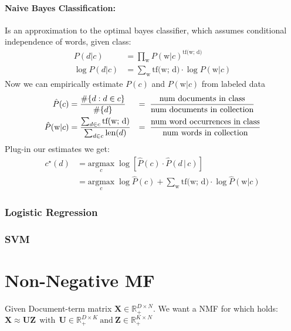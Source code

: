 \documentclass[a4paper,11pt]{article}
\newcommand{\R}{\mathbb{R}}
\newcommand{\msection}[1]{\section{#1}\vspace{-0.5mm}}
\newcommand{\tf}{\text{tf(w; d)}} %
\newcommand{\w}{\text{w}}
\begin{document}
\begin{multicols}{2}
\paragraph{Naive Bayes Classification:}
Is an approximation to the optimal bayes classifier, which assumes conditional independence of words, given class:
\begin{align*}
  P(d | c) &= \prod_{\w} P(\w | c)^{\tf} \\
  \log P(d | c) &= \sum_{\w} \tf \cdot \log P(\w | c)
\end{align*}
Now we can empirically estimate $P(c)$ and $P(\w | c)$ from labeled data
\begin{align*}
  \hat{P}(c) &= \frac{\# \{d : d \in c \}}{\# \{ d \}} &=& \hspace{0.2cm} \frac{\text{num documents in class}}{\text{num documents in collection}}\\
  \hat{P}(\w | c) &= \frac{\sum_{d \in c} \tf}{\sum_{d \in c} \text{len}(d)} &=& \hspace{0.2cm}  \frac{\text{num word occurrences in class}}{\text{num words in collection}} \\
\end{align*}
Plug-in our estimates we get:
\begin{align*}
  c^{\star}(d) &= \underset{c}{\text{argmax}} \; \log \left[ \hat{P}(c) \cdot  \hat{P}(d \, | \, c) \right] \\
               &= \underset{c}{\text{argmax}} \; \log \hat{P}(c) + \sum_{\w} \tf \cdot \log \hat{P}(\w | c)
\end{align*}
\subsubsection{Logistic Regression}

\subsubsection{SVM}


\msection{Non-Negative MF}
Given Document-term matrix $\mathbf X\in \R_+^{D\times N}$. We want a NMF for which holds:\\
\vspace{-0.1cm}\hspace{2.5cm}
$\mathbf X \approx \mathbf{UZ} \ \ \text{with}\ \  \mathbf U\in \R_+^{D \times K}\ \text{and}\ \mathbf Z\in \R_+^{K\times N}$

\end{multicols}
\end{document}
